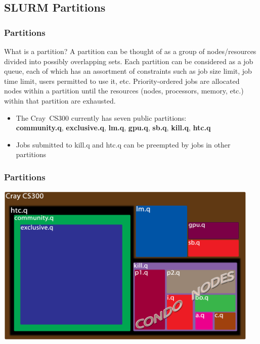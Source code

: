 \documentclass[t,hyperref={pdfpagelabels=false}]{beamer}
\newcommand{\craycs}{Cray~CS300}
\begin{document}
\subsection{SLURM Partitions}
\begin{frame}
\footnotesize
\frametitle{Partitions}
\begin{block}{What is a partition?}\footnotesize
A partition can be thought of as a group of nodes/resources divided into possibly overlapping sets.  Each partition can be considered as a job queue, each of which has an assortment of constraints such as job size limit, job time limit, users permitted to use it, etc. Priority-ordered jobs are allocated nodes within a partition until the resources (nodes, processors, memory, etc.) within that partition are exhausted.\footnotemark
\end{block}
\begin{itemize}
	\item The {\craycs} currently has seven public partitions:~\\\textbf{community.q}, \textbf{exclusive.q}, \textbf{lm.q}, \textbf{gpu.q}, \textbf{sb.q}, \textbf{kill.q}, \textbf{htc.q}
	\item Jobs submitted to kill.q and htc.q can be preempted by jobs in other partitions
\end{itemize}
\end{frame}

\begin{frame}
\frametitle{Partitions}
\includegraphics[width=0.95\textwidth]{images/partitions}
\end{frame}
\end{document}
